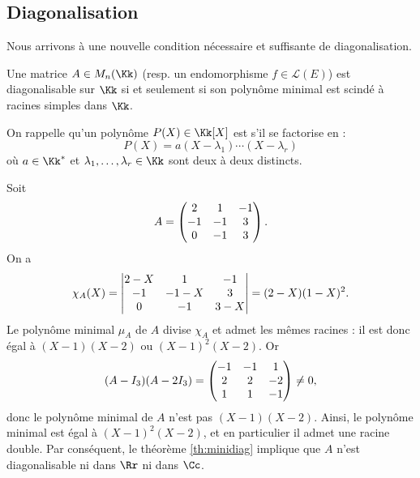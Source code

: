 \documentclass[12pt, class=report,crop=false]{standalone}
\begin{document}
\subsection{Diagonalisation}


Nous arrivons à une nouvelle condition nécessaire et suffisante de diagonalisation.


\begin{theoreme}
\label{th:minidiag}
Une matrice $A \in M_n(\Kk)$ (resp. un endomorphisme $f \in\mathcal{L}(E)$) est diagonalisable sur $\Kk$ si et seulement si son polynôme minimal est scindé à racines simples dans $\Kk$.
\end{theoreme}

On rappelle qu'un polynôme $P(X) \in \Kk[X]$ est  
s'il se factorise en :
\[P(X) = a (X-\lambda_1)\cdots(X-\lambda_r)\]
où $a \in \Kk^*$ et $\lambda_1,\ldots,\lambda_r \in \Kk$ sont deux à deux distincts. 


\begin{exemple}
Soit 
$$A=\begin{pmatrix}2&1&-1\cr -1&-1&3\cr 0&-1&3\end{pmatrix}.$$
On a 
$$\chi_A(X)=\begin{vmatrix}2-X&1&-1\cr -1&-1-X&3\cr 0&-1&3-X\end{vmatrix}=(2-X)(1-X)^2.$$
Le polynôme minimal $\mu_A$ de $A$ divise $\chi_A$ et admet les mêmes racines :
il est donc égal à $(X-1)(X-2)$ ou $(X-1)^2(X-2)$. Or
$$(A-I_3)(A-2I_3)=\begin{pmatrix}-1&-1&1\cr 2&2&-2\cr 1&1&-1\end{pmatrix}\neq 0,$$
donc le polynôme minimal de $A$ n'est pas $(X-1)(X-2)$.
Ainsi, le polynôme minimal est égal à $(X-1)^2(X-2)$, 
et en particulier il admet une racine double. Par conséquent, le théorème \ref{th:minidiag} implique que $A$ n'est diagonalisable 
ni dans $\Rr$ ni dans $\Cc$.  
\end{exemple}
\end{document}
